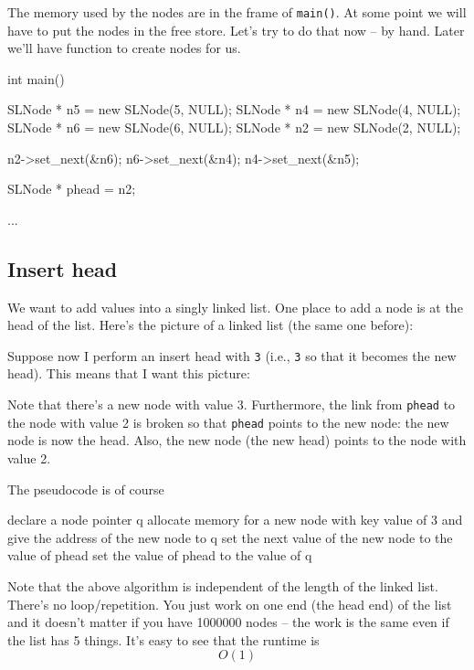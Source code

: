The memory used by the nodes are in the frame of \verb!main()!.
At some point we will have to put the nodes in the free store.
Let's try to do that now -- by hand.
Later we'll have function to create nodes for us.
\begin{console}[frame=single,fontsize=\footnotesize]
int main()
{
    SLNode * n5 = new SLNode(5, NULL);
    SLNode * n4 = new SLNode(4, NULL);
    SLNode * n6 = new SLNode(6, NULL);
    SLNode * n2 = new SLNode(2, NULL);

    n2->set_next(&n6);
    n6->set_next(&n4);
    n4->set_next(&n5);

    SLNode * phead = n2;

    ...
}
\end{console}


\newpage
\subsection{Insert head}

We want to add values into a singly linked list.
One place to add a node is at the head of the list.
Here's the picture of a linked list (the same one before):

Suppose now I perform an insert head with \verb!3! (i.e.,
\verb!3! so that it becomes the new head).
This means that I want this picture:



Note that there's a new node with value 3.
Furthermore, the link from \verb!phead! to the node with value 2 is
broken so that \verb!phead! points to the new node: the new node is now the
head.
Also, the new node (the new head) points to the node with value 2.

The pseudocode is of course
\begin{console}[frame=single,fontsize=\footnotesize]
declare a node pointer q
allocate memory for a new node with key value of 3
    and give the address of the new node to q
set the next value of the new node to the value of phead
set the value of phead to the value of q
\end{console}

Note that the above algorithm is independent of the length of the
linked list.
There's no loop/repetition.
You just work on one end (the head end) of the list and it doesn't matter
if you have 1000000 nodes -- the work is the same even if the list
has 5 things.
It's easy to see that the runtime is
\[
O(1)
\]

